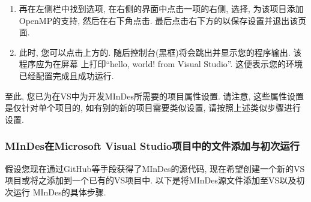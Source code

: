 \begin{enumerate}
    \item 再在左侧栏中找到{}选项,
          在右侧的界面中点击{}一项的右侧, 选择{}, 为该项目添加OpenMP的支持,
          然后在右下角点击{}. 最后点击右下方的{}以保存设置并退出该页面.
    \item 此时, 您可以点击上方的{}. 随后控制台(黑框)将会跳出并显示您的程序输出. 该程序应为在屏幕
          上打印``hello, world! from Visual Studio''. 这便表示您的环境已经配置完成且成功运行.
\end{enumerate}

至此, 您已为在VS中为开发MInDes所需要的项目属性设置. 请注意, 这些属性设置是仅针对单个项目的, 如有别的新的项目需要类似设置,
请按照上述类似步骤进行设置.

\subsubsection{MInDes在Microsoft Visual Studio项目中的文件添加与初次运行}
假设您现在通过GitHub等手段获得了MInDes的源代码, 现在希望创建一个新的VS项目或将之添加到一个已有的VS项目中. 以下是将MInDes源文件添加至VS以及初次运行
MInDes的具体步骤.

